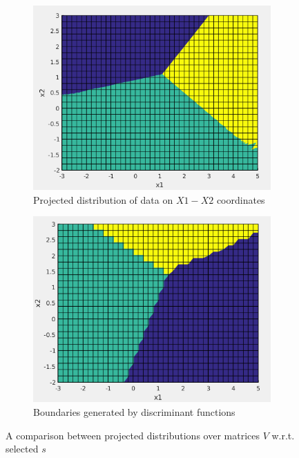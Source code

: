 \documentclass[12pt]{article}
\begin{document}
\begin{enumerate}
\begin{figure}[H]
\centering
\begin{subfigure}{0.4\textwidth}
\includegraphics[scale=0.3]{Imgs/3-2.png}
\caption{Projected distribution of data on $X1-X2$ coordinates}
\end{subfigure}
\begin{subfigure}{0.4\textwidth}
\includegraphics[scale=0.3]{Imgs/3-3.png}
\caption{Boundaries generated by discriminant functions}
\end{subfigure}
\caption{A comparison between projected distributions over matrices $V$ w.r.t. selected $s$}
\label{fig:3}
\end{figure}



\end{enumerate}
\end{document}
